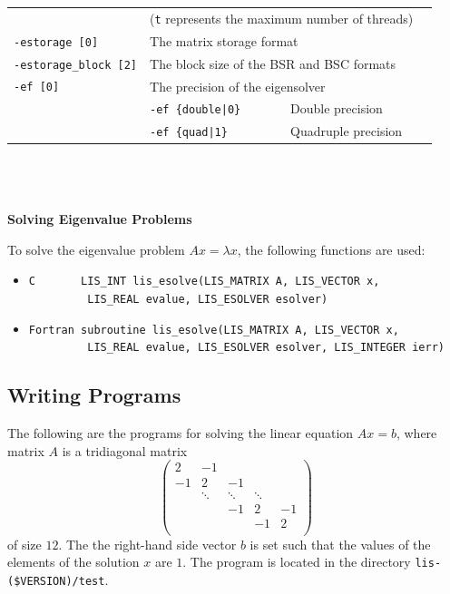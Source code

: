 \documentclass[a4paper]{article}
\begin{document}
\begin{minipage}[t]{\textwidth}
\begin{center}
\begin{tabular}{l|ll}
                            & (\verb=t= represents the maximum number of
 threads) \\
\verb=-estorage [0]=   & The matrix storage format \\
\verb=-estorage_block [2]=& The block size of the BSR and BSC formats\\ 
\verb=-ef [0]=         & The precision of the eigensolver\\
                       & \verb=-ef {double|0}       =  Double precision \\ 
                       & \verb=-ef {quad|1}         =  Quadruple precision \\
\hline         
\end{tabular}
\end{center}
\end{minipage}
\\ \\ \\
\noindent
{\bf Solving Eigenvalue Problems}

To solve the eigenvalue problem $Ax = \lambda x$, the following functions are used:
\begin{itemize}
\item \verb|C       LIS_INT lis_esolve(LIS_MATRIX A, LIS_VECTOR x,|\\ 
      \verb|         LIS_REAL evalue, LIS_ESOLVER esolver)|
\item \verb|Fortran subroutine lis_esolve(LIS_MATRIX A, LIS_VECTOR x,|\\
      \verb|         LIS_REAL evalue, LIS_ESOLVER esolver, LIS_INTEGER ierr)|
\end{itemize}

\subsection{Writing Programs}
\label{sec:testprog3}
The following are the programs for solving the linear equation $Ax = b$,
where matrix $A$ is a tridiagonal matrix 
\[
\left(
\begin{array}{ccccc}
2 & -1 &   &  &   \\
-1 & 2 & -1 &  &   \\
  & \ddots  & \ddots  & \ddots  &   \\
  &   & -1 & 2 & -1 \\
  &   &   & -1 & 2 \\
\end{array}
\right)
\]
of size $12$.
The the right-hand side vector $b$ is set such that the values of the elements of the solution $x$ are $1$. 
The program is located in the directory \verb|lis-($VERSION)/test|. 
\end{document}
